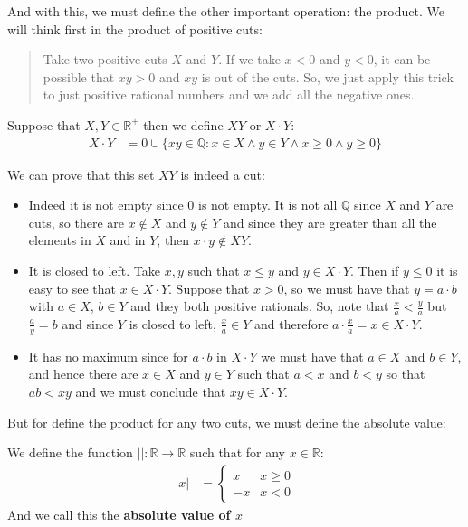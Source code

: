 \documentclass{tufte-handout}
\begin{document}
And with this, we must define the other important operation: the product. We will think first in the product of positive cuts:
\begin{quote}
	Take two positive cuts $X$ and $Y$. If we take $x < 0$ and $y < 0$, it can be possible that $xy > 0$ and $xy$ is out of the cuts. So, we just apply this trick to just positive rational numbers and we add all the negative ones.
\end{quote}
\begin{definition}
	Suppose that $X, Y \in \mathbb{R}^+$ then we define $XY$ or $X \cdot Y$:
	\begin{align*}
		X\cdot Y &= 0 \cup \{xy \in \mathbb{Q}: x \in X \wedge y \in Y \wedge x \ge 0 \wedge y \ge 0\}
	\end{align*}
\end{definition}

We can prove that this set $XY$ is indeed a cut:
\begin{itemize}
	\item Indeed it is not empty since $0$ is not empty. It is not all $\mathbb{Q}$ since $X$ and $Y$ are cuts, so there are $x \not\in X$ and $y \not\in Y$ and since they are greater than all the elements in $X$ and in $Y$, then $x \cdot y \not \in XY$.
	\item It is closed to left. Take $x, y$ such that $x \le y$ and $y \in X \cdot Y$. Then if $y \le 0$ it is easy to see that $x \in X \cdot Y$. Suppose that $x > 0$, so we must have that $y = a \cdot b$ with $a \in X$, $b \in Y$ and they both positive rationals. So, note that $\frac{x}{a} < \frac{y}{a}$ but $\frac{a}{y} = b$ and since $Y$ is closed to left, $\frac{x}{a} \in Y$ and therefore $a \cdot \frac{x}{a} = x \in X \cdot Y$.  
	\item It has no maximum since for $a\cdot b$ in $X \cdot Y$ we must have that $a \in X$ and $b \in Y$, and hence there are $x \in X$ and $y \in Y$ such that $a < x$ and $b < y$ so that $ab < xy$ and we must conclude that $xy \in X \cdot Y$.
\end{itemize} 

But for define the product for any two cuts, we must define the absolute value:
\begin{definition}
	We define the function $||: \mathbb{R} \to \mathbb{R}$ such that for any $x \in \mathbb{R}$:
	\begin{align*}
		|x| &= \begin{cases}
			x & x \ge 0\\
			-x & x < 0
		\end{cases}
	\end{align*}
	And we call this the \textbf{absolute value of $x$}
\end{definition}
\end{document}
